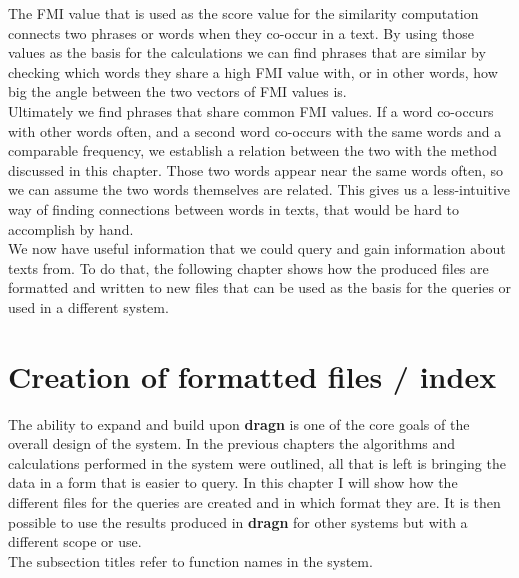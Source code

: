 The FMI value that is used as the score value for the similarity computation connects two phrases or words when they co-occur in a text. By using those values as the basis for the calculations we can find phrases that are similar by checking which words they share a high FMI value with, or in other words, how big the angle between the two vectors of FMI values is.\\
Ultimately we find phrases that share common FMI values. If a word co-occurs with other words often, and a second word co-occurs with the same words and a comparable frequency, we establish a relation between the two with the method discussed in this chapter. Those two words appear near the same words often, so we can assume the two words themselves are related. This gives us a less-intuitive way of finding connections between words in texts, that would be hard to accomplish by hand.\\
We now have useful information that we could query and gain information about texts from. To do that, the following chapter shows how the produced files are formatted and written to new files that can be used as the basis for the queries or used in a different system.

\section{Creation of formatted files / index}
\label{sec:indexstep}
The ability to expand and build upon \textbf{dragn} is one of the core goals of the overall design of the system. In the previous chapters the algorithms and calculations performed in the system were outlined, all that is left is bringing the data in a form that is easier to query. In this chapter I will show how the different files for the queries are created and in which format they are. It is then possible to use the results produced in \textbf{dragn} for other systems but with a different scope or use.\\
The subsection titles refer to function names in the system.
